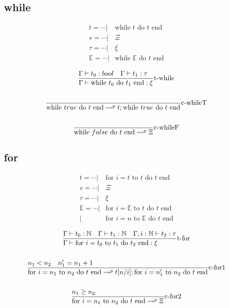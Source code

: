\documentclass{article}
\newcommand{\st}[3][]{\ensuremath{\displaystyle\frac{#3\hfill}{#2\hfill} \text{#1}}}
\newcommand{\N}{\ensuremath \mathbb N}
\newcommand{\while}[2]{\ensuremath{\text{while }#1\text{ do }#2\text{ end}}}
\newcommand{\for}[3]{\ensuremath{\text{for }i=#1\text{ to }#2\text{ do }#3\text{ end}}}
\newcommand{\mE}[0]{\ensuremath{\mathbb{E}}}
\begin{document}
\subsection{while}
\begin{align*}
    t = \cdots |& \while{t}{t} \\
    v = \cdots |& \Xi \\
    \tau = \cdots |& \xi \\
    \mE = \cdots |& \while{\mE}{t} \\
\end{align*}
\begin{gather*}
    \st[t-while]{\Gamma\vdash \while{t_0}{t_1}: \xi }{\Gamma\vdash t_0:bool \quad \Gamma\vdash t_1:\tau} \\
    \\
    \st[c-whileT]{\while{true}{t} \leadsto^p t;\while{true}{t} }{} \\
    \\
    \st[c-whileF]{\while{false}{t} \leadsto^p \Xi }{}
\end{gather*}

\subsection{for}
\begin{align*}
    t = \cdots |& \for{t}{t}{t} \\
    v = \cdots |& \Xi \\
    \tau = \cdots |& \xi \\
    \mE = \cdots  |& \for{\mE}{t}{t} \\
                  |& \for{n}{\mE}{t} \\
\end{align*}
\begin{gather*}
    \st[t-for]{\Gamma\vdash \for{t_0}{t_1}{t_2}: \xi }{\Gamma\vdash t_0:\N \quad \Gamma\vdash t_1:\N \quad \Gamma,i:\N\vdash t_2:\tau} \\
    \\
    \st[c-for1]{
        \for{n_1}{n_2}{t} \leadsto^p t[n/i];\for{n_1'}{n_2}{t}
    }{
        n_1<n_2
        \quad
        n_1' = n_1+1
    } \\
    \\
    \st[c-for2]{
        \for{n_1}{n_2}{t} \leadsto^p \Xi
    }{
        n_1\geq n_2
    } \\
\end{gather*}
\end{document}
